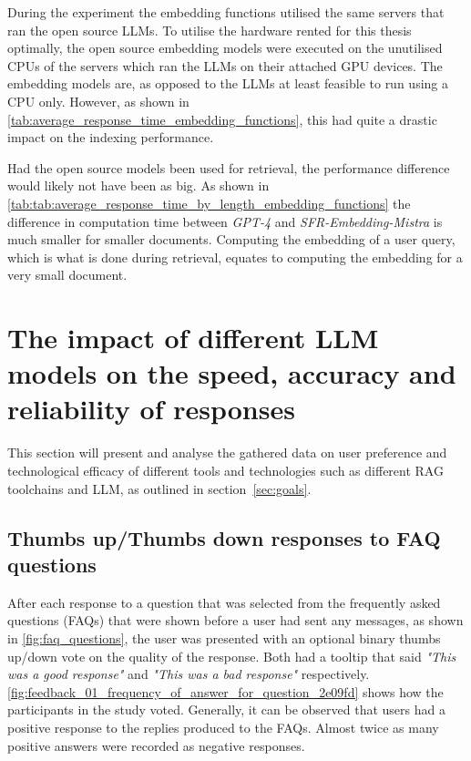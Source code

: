 


During the experiment the embedding functions utilised the same servers that ran the open source \gls{LLM}s. To utilise the hardware rented for this thesis optimally, the open source embedding models were executed on the unutilised CPUs of the servers which ran the \gls{LLM}s on their attached GPU devices. The embedding models are, as opposed to the \gls{LLM}s at least feasible to run using a CPU only. However, as shown in \autoref{tab:average_response_time_embedding_functions}, this had quite a drastic impact on the indexing performance.


Had the open source models been used for retrieval, the performance difference would likely not have been as big. As shown in \autoref{tab:tab:average_response_time_by_length_embedding_functions} the difference in computation time between \textit{GPT-4} and \textit{SFR-Embedding-Mistra} is much smaller for smaller documents. Computing the embedding of a user query, which is what is done during retrieval, equates to computing the embedding for a very small document.







\section{The impact of different LLM models on the speed, accuracy and reliability of responses}
\label{sec:impact_of_llm_on_user_preferences}


This section will present and analyse the gathered data on user preference and technological efficacy of different tools and technologies such as different \gls{RAG} toolchains and \gls{LLM}, as outlined in section~\ref{sec:goals}.


\subsection{Thumbs up/Thumbs down responses to FAQ questions}


After each response to a question that was selected from the frequently asked questions (FAQs) that were shown before a user had sent any messages, as shown in \autoref{fig:faq_questions}, the user was presented with an optional binary thumbs up/down vote on the quality of the response. Both had a tooltip that said \textit{"This was a good response"} and \textit{"This was a bad response"} respectively. \autoref{fig:feedback_01_frequency_of_answer_for_question_2e09fd} shows how the participants in the study voted. Generally, it can be observed that users had a positive response to the replies produced to the FAQs. Almost twice as many positive answers were recorded as negative responses.


